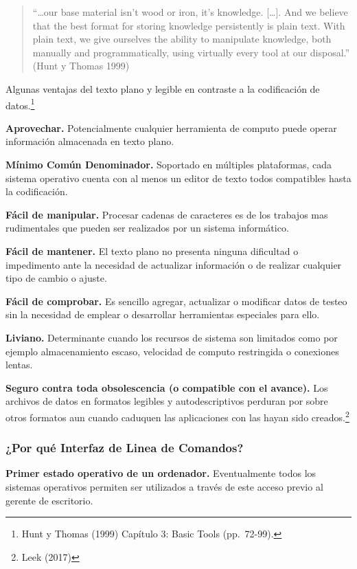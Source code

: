 \documentclass[]{article}
\begin{document}
\begin{quote}
``\ldots our base material isn't wood or iron, it's knowledge.
{[}\ldots{]}. And we believe that the best format for storing knowledge
persistently is plain text. With plain text, we give ourselves the
ability to manipulate knowledge, both manually and programmatically,
using virtually every tool at our disposal.'' (Hunt y Thomas 1999)
\end{quote}

\bigskip

Algunas ventajas del texto plano y legible en contraste a la
codificación de datos.\footnote{Hunt y Thomas (1999) Capítulo 3: Basic
  Tools (pp.~72-99).}

\textbf{Aprovechar.} Potencialmente cualquier herramienta de computo
puede operar información almacenada en texto plano.

\textbf{Mínimo Común Denominador.} Soportado en múltiples plataformas,
cada sistema operativo cuenta con al menos un editor de texto todos
compatibles hasta la codificación.

\textbf{Fácil de manipular.} Procesar cadenas de caracteres es de los
trabajos mas rudimentales que pueden ser realizados por un sistema
informático.

\textbf{Fácil de mantener.} El texto plano no presenta ninguna
dificultad o impedimento ante la necesidad de actualizar información o
de realizar cualquier tipo de cambio o ajuste.

\textbf{Fácil de comprobar.} Es sencillo agregar, actualizar o modificar
datos de testeo sin la necesidad de emplear o desarrollar herramientas
especiales para ello.

\textbf{Liviano.} Determinante cuando los recursos de sistema son
limitados como por ejemplo almacenamiento escaso, velocidad de computo
restringida o conexiones lentas.

\textbf{Seguro contra toda obsolescencia (o compatible con el avance).}
Los archivos de datos en formatos legibles y autodescriptivos perduran
por sobre otros formatos aun cuando caduquen las aplicaciones con las
hayan sido creados.\footnote{Leek (2017)}

\hypertarget{por-quuxe9-interfaz-de-linea-de-comandos}{%
\subsubsection{¿Por qué Interfaz de Linea de
Comandos?}\label{por-quuxe9-interfaz-de-linea-de-comandos}}

\textbf{Primer estado operativo de un ordenador.} Eventualmente todos
los sistemas operativos permiten ser utilizados a través de este acceso
previo al gerente de escritorio.
\end{document}
